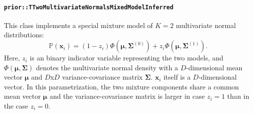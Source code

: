 \documentclass[a4paper,11pt]{article}
\def\x{\boldsymbol{x}}
\def\bmu{\boldsymbol{\mu}}
\def\bSigma{\boldsymbol{\Sigma}}
\def\p{\mathbb{P}}
\newcommand{\class}[1]{\texttt{#1}}
\begin{document}
\paragraph{\class{prior::TTwoMultivariateNormalsMixedModelInferred}}
This class implements a special mixture model of $K=2$ multivariate normal distributions:
\begin{equation*}
 \p(\x_i) = (1-z_i)\Phi(\bmu, \bSigma^{(0)}) + z_i \Phi(\bmu, \bSigma^{(1)}).
\end{equation*}
Here, $z_i$ is an binary indicator variable representing the two models, and $\Phi(\bmu, \bSigma)$ denotes the multivariate normal density with a $D$-dimensional mean vector $\bmu$ and $D$x$D$ variance-covariance matrix $\bSigma$. $\x_i$ itself is a $D$-dimensional vector.
In this parametrization, the two mixture components share a common mean vector $\bmu$ and the variance-covariance matrix is larger in case $z_i = 1$ than in the case $z_i = 0$.
\end{document}

